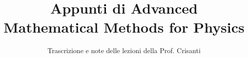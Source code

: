 \documentclass[a4paper,12pt]{article}
\title{Appunti di Advanced Mathematical Methods for Physics}
\author{Trascrizione e note delle lezioni della Prof. Crisanti}
\date{}
\begin{document}
\maketitle
\projectintro
\tableofcontents
\newpage

\end{document}
